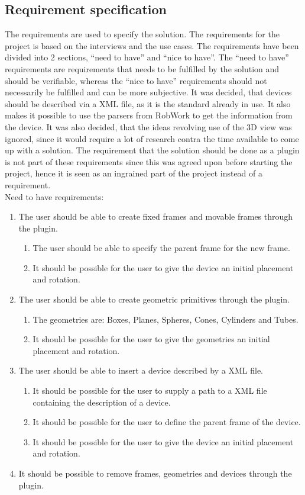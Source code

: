 \subsection{Requirement specification}
The requirements are used to specify the solution. The requirements for the project is based on the interviews and the use cases. The requirements have been divided into 2 sections, “need to have” and “nice to have”. The “need to have” requirements are requirements that needs to be fulfilled by the solution and should be verifiable, whereas the “nice to have” requirements should not necessarily be fulfilled and can be more subjective. It was decided, that devices should be described via a XML file, as it is the standard already in use. It also makes it possible to use the parsers from RobWork to get the information from the device. It was also decided, that the ideas revolving use of the 3D view was ignored, since it would require a lot of research contra the time available to come up with a solution. The requirement that the solution should be done as a plugin is not part of these requirements since this was agreed upon before starting the project, hence it is seen as an ingrained part of the project instead of a requirement.\\

Need to have requirements:
\begin{enumerate}
	\item The user should be able to create fixed frames and movable frames through the plugin.
	\begin{enumerate}
		\item The user should be able to specify the parent frame for the new
		 frame.
		 \item It should be possible for the user to give the device an initial placement and rotation.
	\end{enumerate}
	\item The user should be able to create geometric primitives through the plugin.
	\begin{enumerate}
		\item The geometries are: Boxes, Planes, Spheres, Cones, Cylinders and Tubes.
		\item It should be possible for the user to give the geometries an initial placement and rotation.
	\end{enumerate}
	\item The user should be able to insert a device described by a XML file.
	\begin{enumerate}
		\item It should be possible for the user to supply a path to a XML file containing the description of a device.
		\item It should be possible for the user to define the parent frame of the device.
		\item It should be possible for the user to give the device an initial placement and rotation.
	\end{enumerate}
	\item It should be possible to remove frames, geometries and devices through the plugin.
\end{enumerate}

